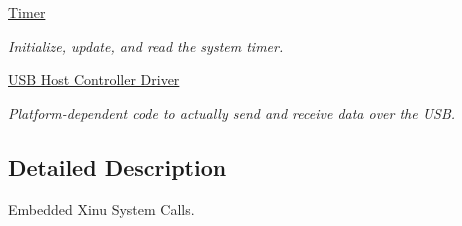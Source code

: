 \begin{DoxyCompactItemize}
\hyperlink{group__timer}{Timer}
\begin{DoxyCompactList}\small\item\em Initialize, update, and read the system timer. \end{DoxyCompactList}\item 
\hyperlink{group__usbhcd}{U\-S\-B Host Controller Driver}
\begin{DoxyCompactList}\small\item\em Platform-\/dependent code to actually send and receive data over the U\-S\-B. \end{DoxyCompactList}\end{DoxyCompactItemize}


\subsection{Detailed Description}
Embedded Xinu System Calls. 